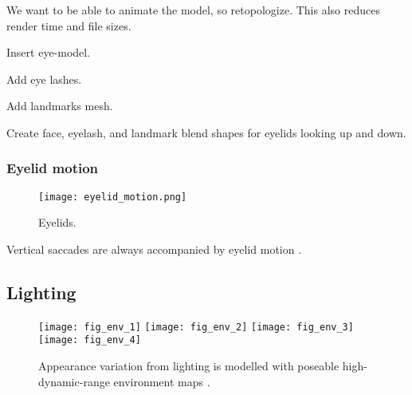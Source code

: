 

We want to be able to animate the model, so retopologize. This also reduces render time and file sizes.

Insert eye-model.

Add eye lashes.

Add landmarks mesh.

Create face, eyelash, and landmark blend shapes for eyelids looking up and down.

\subsubsection{Eyelid motion}

\begin{figure}
    \texttt{[image: eyelid\_motion.png]}
    \caption{Eyelids.}
\end{figure}

Vertical saccades are always accompanied by eyelid motion \cite{liversedge2011oxford}.

\subsection{Lighting}

\begin{figure}
    \texttt{[image: fig\_env\_1]} \hfill
    \texttt{[image: fig\_env\_2]} \hfill
    \texttt{[image: fig\_env\_3]} \hfill
    \texttt{[image: fig\_env\_4]}
    \caption{Appearance variation from lighting is modelled with poseable high-dynamic-range environment maps \cite{debevec2002image}.}
    \label{fig:participants}
\end{figure}
